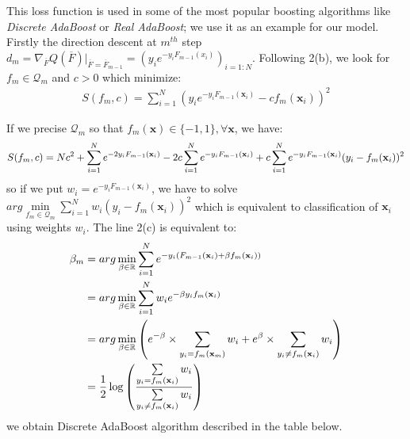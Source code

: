 \documentclass[a4paper,twoside,12pt]{article}
\begin{document}
This loss function is used in some of the most popular boosting algorithms like \textsl{Discrete AdaBoost} or \textsl{Real AdaBoost}; we use it as an example for our model. Firstly the direction descent at $m^{th}$ step $d_m = \nabla_{\overline{F}} Q(\overline{F})\vert_{\overline{F} = \overline{F}_{m-1}} = \left( y_ie^{-y_iF_{m-1}(x_i)}\right)_{i=1:N}$. Following 2(b), we look for $f_m \in \mathcal{Q}_m$ and $c > 0$ which minimize:
\begin{align}
    S(f_m, c) = \sum\limits_{i=1}^N \left( y_ie^{-y_iF_{m-1}(\textbf{x}_i)} - cf_m(\textbf{x}_i)\right)^2 \label{exp_loss_approcher}
\end{align}

If we precise $\mathcal{Q}_m$ so that $f_m(\textbf{x}) \in \{-1, 1\}, \forall \textbf{x}$, we have:
\begin{align}
    S(f_m, c) = Nc^2 + \sum\limits_{i=1}^N e^{-2y_iF_{m-1}(\textbf{x}_i)} - 2c\sum\limits_{i=1}^N e^{-y_iF_{m-1}(\textbf{x}_i)} + c\sum\limits_{i=1}^N e^{-y_iF_{m-1}(\textbf{x}_i)}(y_i - f_m(\textbf{x}_i))^2 \notag
\end{align}
so if we put $w_i = e^{-y_iF_{m-1}(\textbf{x}_i)}$, we have to solve $arg\min\limits_{f_m \in \mathcal{Q}_m} \sum\limits_{i=1}^N w_i(y_i - f_m(\textbf{x}_i))^2$ which is equivalent to classification of $\textbf{x}_i$ using weights $w_i$. The line 2(c) is equivalent to:
\begin{align}
    \beta_m &= arg\min\limits_{\beta \in \mathbb{R}} \sum\limits_{i=1}^N e^{-y_i(F_{m-1}(\textbf{x}_i)+\beta f_m(\textbf{x}_i))} \notag \\
    &= arg\min\limits_{\beta \in \mathbb{R}} \sum\limits_{i=1}^N w_ie^{-\beta y_if_m(\textbf{x}_i)} \notag \\
    &= arg\min\limits_{\beta \in \mathbb{R}} \left( e^{-\beta}\times \sum\limits_{y_i = f_m(\textbf{x}_m)} w_i + e^{\beta}\times \sum\limits_{y_i \neq f_m(\textbf{x}_i)} w_i\right) \notag \\
    &= \dfrac{1}{2}\log\left( \dfrac{\sum\limits_{y_i = f_m(\textbf{x}_i)} w_i}{\sum\limits_{y_i \neq f_m(\textbf{x}_i)} w_i}\right) \notag
\end{align}
we obtain Discrete AdaBoost algorithm described in the table below.

\begin{center}
\end{center}
\end{document}

